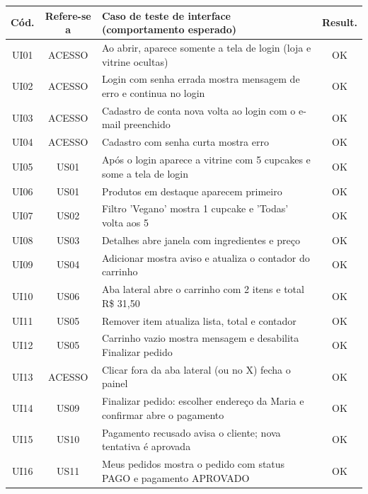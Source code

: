 \footnotesize
\begin{longtable}{|c|c|p{9.4cm}|c|}
\hline
\rowcolor{gray!30} \textbf{Cód.} & \textbf{Refere-se a} & \textbf{Caso de teste de interface (comportamento esperado)} & \textbf{Result.} \\ \hline
\endhead
UI01 & ACESSO & Ao abrir, aparece somente a tela de login (loja e vitrine ocultas) & \cellcolor{green!20}OK \\ \hline
UI02 & ACESSO & Login com senha errada mostra mensagem de erro e continua no login & \cellcolor{green!20}OK \\ \hline
UI03 & ACESSO & Cadastro de conta nova volta ao login com o e-mail preenchido & \cellcolor{green!20}OK \\ \hline
UI04 & ACESSO & Cadastro com senha curta mostra erro & \cellcolor{green!20}OK \\ \hline
UI05 & US01 & Após o login aparece a vitrine com 5 cupcakes e some a tela de login & \cellcolor{green!20}OK \\ \hline
UI06 & US01 & Produtos em destaque aparecem primeiro & \cellcolor{green!20}OK \\ \hline
UI07 & US02 & Filtro 'Vegano' mostra 1 cupcake e 'Todas' volta aos 5 & \cellcolor{green!20}OK \\ \hline
UI08 & US03 & Detalhes abre janela com ingredientes e preço & \cellcolor{green!20}OK \\ \hline
UI09 & US04 & Adicionar mostra aviso e atualiza o contador do carrinho & \cellcolor{green!20}OK \\ \hline
UI10 & US06 & Aba lateral abre o carrinho com 2 itens e total R\$ 31,50 & \cellcolor{green!20}OK \\ \hline
UI11 & US05 & Remover item atualiza lista, total e contador & \cellcolor{green!20}OK \\ \hline
UI12 & US05 & Carrinho vazio mostra mensagem e desabilita Finalizar pedido & \cellcolor{green!20}OK \\ \hline
UI13 & ACESSO & Clicar fora da aba lateral (ou no X) fecha o painel & \cellcolor{green!20}OK \\ \hline
UI14 & US09 & Finalizar pedido: escolher endereço da Maria e confirmar abre o pagamento & \cellcolor{green!20}OK \\ \hline
UI15 & US10 & Pagamento recusado avisa o cliente; nova tentativa é aprovada & \cellcolor{green!20}OK \\ \hline
UI16 & US11 & Meus pedidos mostra o pedido com status PAGO e pagamento APROVADO & \cellcolor{green!20}OK \\ \hline

\end{longtable}
